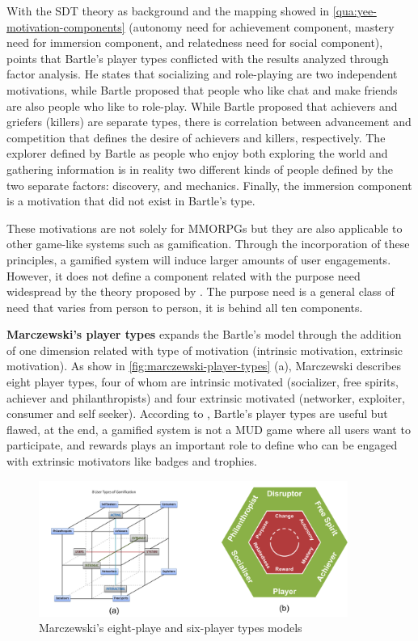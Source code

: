 With the SDT theory as background and the mapping showed in \autoref{qua:yee-motivation-components} (autonomy need for achievement component, mastery need for immersion component, and relatedness need for social component),  points that Bartle's player types conflicted with the results analyzed through factor analysis.
He states that socializing and role-playing are two independent motivations, while Bartle proposed that people who like chat and make friends are also people who like to role-play.
While Bartle proposed that achievers and griefers (killers) are separate types, there is correlation between advancement and competition that defines the desire of achievers and killers, respectively.
The explorer defined by Bartle as people who enjoy both exploring the world and gathering information is in reality two different kinds of people defined by the two separate factors: discovery, and mechanics.
Finally, the immersion component is a motivation that did not exist in Bartle's type.

These motivations are not solely for MMORPGs but they are also applicable to other game-like systems such as gamification.
Through the incorporation of these principles, a gamified system will induce larger amounts of user engagements.
However, it does not define a component related with the purpose need widespread by the theory proposed by .
The purpose need is a general class of need that varies from person to person, it is behind all ten components.

\textbf{Marczewski's player types} \cite{Marczewski2015a, Marczewski2015d} expands the Bartle's model through the addition of one dimension related with type of motivation (intrinsic motivation, extrinsic motivation).
As show in \autoref{fig:marczewski-player-types} (a), Marczewski describes eight player types, four of whom are intrinsic motivated (socializer, free spirits, achiever and philanthropists) and four extrinsic motivated (networker, exploiter, consumer and self seeker).
According to , Bartle's player types are useful but flawed, at the end, a gamified system is not a MUD game where all users want to participate, and rewards plays an important role to define who can be engaged with extrinsic motivators like badges and trophies.

\begin{figure}[htb]
 \caption{Marczewski's eight-playe and six-player types models}
 \label{fig:marczewski-player-types}
 \centering
 \includegraphics[width=0.9\textwidth]{images/chap-general-background/marczewski-player-types.png}
\end{figure}

